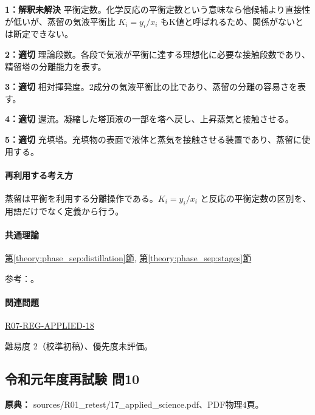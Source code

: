 \noindent\textbf{1：解釈未解決} 平衡定数。化学反応の平衡定数という意味なら他候補より直接性が低いが、蒸留の気液平衡比 \(K_i=y_i/x_i\) もK値と呼ばれるため、関係がないとは断定できない。\par

\noindent\textbf{2：適切} 理論段数。各段で気液が平衡に達する理想化に必要な接触段数であり、精留塔の分離能力を表す。\par

\noindent\textbf{3：適切} 相対揮発度。2成分の気液平衡比の比であり、蒸留の分離の容易さを表す。\par

\noindent\textbf{4：適切} 還流。凝縮した塔頂液の一部を塔へ戻し、上昇蒸気と接触させる。\par

\noindent\textbf{5：適切} 充填塔。充填物の表面で液体と蒸気を接触させる装置であり、蒸留に使用する。\par

\paragraph{再利用する考え方} 蒸留は平衡を利用する分離操作である。\(K_i=y_i/x_i\) と反応の平衡定数の区別を、用語だけでなく定義から行う。

\paragraph{共通理論} \hyperref[theory:phase_sep:distillation]{第\ref*{theory:phase_sep:distillation}節}, \hyperref[theory:phase_sep:stages]{第\ref*{theory:phase_sep:stages}節}

\par 参考：\cite{nptel_distillation1}。

\paragraph{関連問題} \hyperref[q:r07-reg-applied-18]{R07-REG-APPLIED-18}

\par 難易度 2（校準初稿）、優先度未評価。

\subsection{令和元年度再試験 問10}
\label{q:r01-ret-applied-10}

\noindent\textbf{原典：} sources/R01\_retest/17\_applied\_science.pdf、PDF物理4頁。

